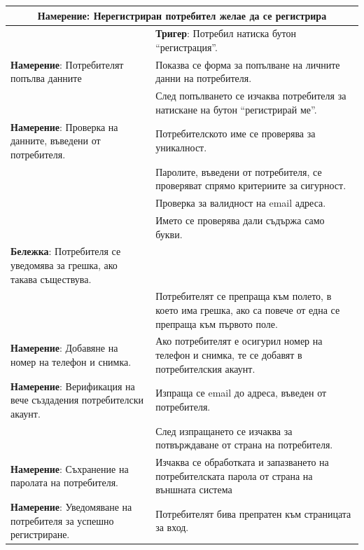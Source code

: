 \documentclass[]{article}
\begin{document}
\begin{enumerate}[I.]
{\begin{center}
  \begin{tabular}{ |p{5cm}|p{10cm}| }
    \hline
    \multicolumn{2}{|c|}{\textbf{Намерение}: Нерегистриран потребител желае да се регистрира} \\
    \hline
    & \textbf{Тригер}: Потребил натиска бутон ``регистрация''. \\
    \hline
      \textbf{Намерение}: Потребителят попълва данните & Показва се форма за попълване на личните данни на потребителя. \\
    \hline
     & След попълването се изчаква потребителя за натискане на бутон ``регистрирай ме''. \\
    \hline
    \textbf{Намерение}: Проверка на данните, въведени от потребителя. & Потребителското име се проверява за уникалност. \\
    \hline
     & Паролите, въведени от потребителя, се проверяват спрямо критериите за сигурност. \\
    \hline
     & Проверка за валидност на email адреса. \\
    \hline
     & Името се проверява дали съдържа само букви. \\
    \hline
    \textbf{Бележка}: Потребителя се уведомява за грешка, ако такава съществува.  & \\
    \hline
      & Потребителят се препраща към полето, в което има грешка, ако са повече от една се препраща към първото поле. \\
    \hline
    \textbf{Намерение}: Добавяне на номер на телефон и снимка. & Ако потребителят е осигурил номер на телефон и снимка, те се добавят в потребителския акаунт.  \\
    \hline
    \textbf{Намерение}:  Верификация на вече създадения потребителски акаунт. & Изпраща се email до адреса, въведен от потребителя.  \\
    \hline
     & След изпращането се изчаква за потвърждаване от страна на потребителя. \\
    \hline
    \textbf{Намерение}: Съхранение на паролата на потребителя. & Изчаква се обработката и запазването на потребителската парола от страна на външната система\\
    \hline
    \textbf{Намерение}: Уведомяване на потребителя за успешно регистриране. & Потребителят бива препратен към страницата за вход. \\
    \hline
  \end{tabular}
\end{center}

}
\end{enumerate}
\end{document}
